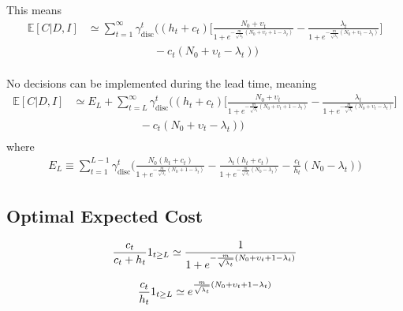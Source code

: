 This means
\begin{equation}
	\begin{split}
		\mathbb{E}[C|D,I] &\simeq  \sum_{t=1}^{\infty} \gamma_{\text{disc}}^{t} \bigg( 
		(h_t+c_t)\bigg[\frac{N_0 + \upsilon_t}{1+e^{-\frac{m}{\sqrt{\lambda_t}}(N_0+\upsilon_t+1-\lambda_t)}}- \frac{\lambda_t}{1+e^{-\frac{m}{\sqrt{\lambda_t}}(N_0+\upsilon_t-\lambda_t)}}\bigg]\\
		&\qquad\qquad\qquad
		- c_t(N_0 + \upsilon_t-\lambda_t)\bigg)\\
	\end{split}
\end{equation}

No decisions can be implemented during the lead time, meaning
\begin{equation}
	\begin{split}
		\mathbb{E}[C|D,I] &\simeq E_L+\sum_{t=L}^{\infty} \gamma_{\text{disc}}^{t} \bigg( 
		(h_t+c_t)\bigg[\frac{N_0 + \upsilon_t}{1+e^{-\frac{m}{\sqrt{\lambda_t}}(N_0+\upsilon_t+1-\lambda_t)}}- \frac{\lambda_t}{1+e^{-\frac{m}{\sqrt{\lambda_t}}(N_0+\upsilon_t-\lambda_t)}}\bigg]\\
		&\qquad\qquad\qquad
		- c_t(N_0 + \upsilon_t-\lambda_t)\bigg)\\
	\end{split}
\end{equation}
where
\begin{equation}
	\begin{split}
		E_L\equiv \sum_{t=1}^{L-1} \gamma_{\text{disc}}^{t} \bigg( 
		\frac{N_0(h_t+c_t)}{1+e^{-\frac{m}{\sqrt{\lambda_t}}(N_0+1-\lambda_t)}}- \frac{\lambda_t(h_t+c_t)}{1+e^{-\frac{m}{\sqrt{\lambda_t}}(N_0-\lambda_t)}}- \frac{c_t}{h_t}(N_0-\lambda_t)\bigg)
	\end{split}
\end{equation}


\subsection{Optimal Expected Cost}

\begin{equation}
	\frac{c_t}{c_t+h_t}1_{t\geq L}\simeq\frac{1}{1+e^{-\frac{m}{\sqrt{\lambda_t}}(N_0+\upsilon_t+1-\lambda_t)}}\\
\end{equation}

\begin{equation}
	\frac{c_t}{h_t}1_{t\geq L}\simeq e^{\frac{m}{\sqrt{\lambda_t}}(N_0+\upsilon_t+1-\lambda_t)}\\
\end{equation}

